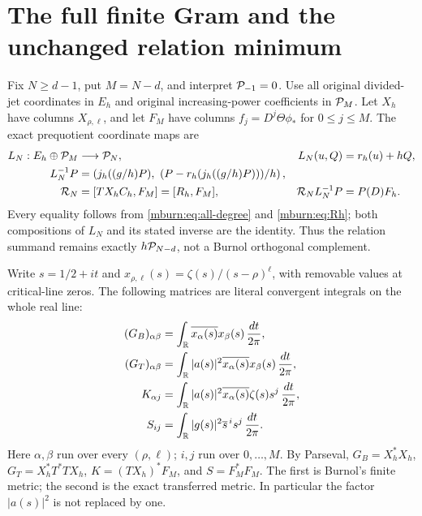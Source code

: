 \section{The full finite Gram and the unchanged relation minimum}

Fix $N\geq d-1$, put $M=N-d$, and interpret $\mathcal P_{-1}=0$.
Use all original divided-jet coordinates in $E_h$ and original
increasing-power coefficients in $\mathcal P_M$. Let $X_h$ have columns
$X_{\rho,\ell}$, and let $F_M$ have columns
$f_j=D^j\Theta\phi_*$ for $0\leq j\leq M$. The exact
prequotient coordinate maps are
\begin{equation}\label{mburn:eq:LN}
 \begin{aligned}
 L_N:E_h\oplus\mathcal P_M&\longrightarrow\mathcal P_N,&
 L_N(u,Q)&=r_h(u)+hQ,\\
 L_N^{-1}P&=\left(j_h((g/h)P),\ (P-r_h(j_h((g/h)P)))/h\right),\\
 \mathcal R_N&=[T X_hC_h,F_M]=[R_h,F_M],&
 \mathcal R_NL_N^{-1}P&=P(D)F_h.
 \end{aligned}
\end{equation}
Every equality follows from \eqref{mburn:eq:all-degree} and
\eqref{mburn:eq:Rh}; both compositions of $L_N$ and its stated
inverse are the identity. Thus the relation summand remains
exactly $h\mathcal P_{N-d}$, not a Burnol orthogonal complement.

Write $s=1/2+it$ and
$x_{\rho,\ell}(s)=\zeta(s)/(s-\rho)^\ell$, with removable
values at critical-line zeros. The following matrices are literal
convergent integrals on the whole real line:
\begin{equation}\label{mburn:eq:grams}
 \begin{aligned}
 (G_B)_{\alpha\beta}
   &=\int_\mathbb R\overline{x_\alpha(s)}x_\beta(s)\,\frac{dt}{2\pi},\\
 (G_T)_{\alpha\beta}
   &=\int_\mathbb R|a(s)|^2\overline{x_\alpha(s)}x_\beta(s)\,\frac{dt}{2\pi},\\
 K_{\alpha j}
   &=\int_\mathbb R|a(s)|^2\overline{x_\alpha(s)}\zeta(s)s^j\,\frac{dt}{2\pi},\\
 S_{ij}
   &=\int_\mathbb R|g(s)|^2\overline{s}^{\,i}s^j\,\frac{dt}{2\pi}.
 \end{aligned}
\end{equation}
Here $\alpha,\beta$ run over every $(\rho,\ell)$; $i,j$ run
over $0,\ldots,M$. By Parseval, $G_B=X_h^*X_h$,
$G_T=X_h^*T^*TX_h$, $K=(TX_h)^*F_M$, and $S=F_M^*F_M$.
The first is Burnol's finite metric; the second is the exact
transferred metric. In particular the factor $|a(s)|^2$ is not
replaced by one.

